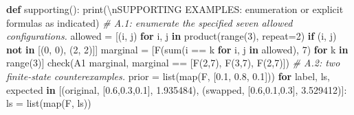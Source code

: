 \documentclass[
]{article}
\newenvironment{Shaded}{}{}
\newcommand{\BuiltInTok}[1]{\textcolor[rgb]{0.00,0.50,0.00}{#1}}
\newcommand{\CharTok}[1]{\textcolor[rgb]{0.25,0.44,0.63}{#1}}
\newcommand{\CommentTok}[1]{\textcolor[rgb]{0.38,0.63,0.69}{\textit{#1}}}
\newcommand{\ControlFlowTok}[1]{\textcolor[rgb]{0.00,0.44,0.13}{\textbf{#1}}}
\newcommand{\DecValTok}[1]{\textcolor[rgb]{0.25,0.63,0.44}{#1}}
\newcommand{\FloatTok}[1]{\textcolor[rgb]{0.25,0.63,0.44}{#1}}
\newcommand{\KeywordTok}[1]{\textcolor[rgb]{0.00,0.44,0.13}{\textbf{#1}}}
\newcommand{\NormalTok}[1]{#1}
\newcommand{\OperatorTok}[1]{\textcolor[rgb]{0.40,0.40,0.40}{#1}}
\newcommand{\StringTok}[1]{\textcolor[rgb]{0.25,0.44,0.63}{#1}}
\begin{document}
\begin{Shaded}
\begin{Highlighting}[]
\KeywordTok{def}\NormalTok{ supporting():}
    \BuiltInTok{print}\NormalTok{(}\StringTok{\textquotesingle{}}\CharTok{\textbackslash{}n}\StringTok{SUPPORTING EXAMPLES: enumeration or explicit formulas as indicated\textquotesingle{}}\NormalTok{)}
    \CommentTok{\# A.1: enumerate the specified seven allowed configurations.}
\NormalTok{    allowed }\OperatorTok{=}\NormalTok{ [(i, j) }\ControlFlowTok{for}\NormalTok{ i, j }\KeywordTok{in}\NormalTok{ product(}\BuiltInTok{range}\NormalTok{(}\DecValTok{3}\NormalTok{), repeat}\OperatorTok{=}\DecValTok{2}\NormalTok{)}
               \ControlFlowTok{if}\NormalTok{ (i, j) }\KeywordTok{not} \KeywordTok{in}\NormalTok{ [(}\DecValTok{0}\NormalTok{, }\DecValTok{0}\NormalTok{), (}\DecValTok{2}\NormalTok{, }\DecValTok{2}\NormalTok{)]]}
\NormalTok{    marginal }\OperatorTok{=}\NormalTok{ [F(}\BuiltInTok{sum}\NormalTok{(i }\OperatorTok{==}\NormalTok{ k }\ControlFlowTok{for}\NormalTok{ i, j }\KeywordTok{in}\NormalTok{ allowed), }\DecValTok{7}\NormalTok{) }\ControlFlowTok{for}\NormalTok{ k }\KeywordTok{in} \BuiltInTok{range}\NormalTok{(}\DecValTok{3}\NormalTok{)]}
\NormalTok{    check(}\StringTok{\textquotesingle{}A1 marginal\textquotesingle{}}\NormalTok{, marginal }\OperatorTok{==}\NormalTok{ [F(}\DecValTok{2}\NormalTok{,}\DecValTok{7}\NormalTok{), F(}\DecValTok{3}\NormalTok{,}\DecValTok{7}\NormalTok{), F(}\DecValTok{2}\NormalTok{,}\DecValTok{7}\NormalTok{)])}
    \CommentTok{\# A.2: two finite{-}state counterexamples.}
\NormalTok{    prior }\OperatorTok{=} \BuiltInTok{list}\NormalTok{(}\BuiltInTok{map}\NormalTok{(F, [}\StringTok{\textquotesingle{}0.1\textquotesingle{}}\NormalTok{, }\StringTok{\textquotesingle{}0.8\textquotesingle{}}\NormalTok{, }\StringTok{\textquotesingle{}0.1\textquotesingle{}}\NormalTok{]))}
    \ControlFlowTok{for}\NormalTok{ label, ls, expected }\KeywordTok{in}\NormalTok{ [(}\StringTok{\textquotesingle{}original\textquotesingle{}}\NormalTok{, [}\StringTok{\textquotesingle{}0.6\textquotesingle{}}\NormalTok{,}\StringTok{\textquotesingle{}0.3\textquotesingle{}}\NormalTok{,}\StringTok{\textquotesingle{}0.1\textquotesingle{}}\NormalTok{], }\FloatTok{1.935484}\NormalTok{),}
\NormalTok{                                (}\StringTok{\textquotesingle{}swapped\textquotesingle{}}\NormalTok{, [}\StringTok{\textquotesingle{}0.6\textquotesingle{}}\NormalTok{,}\StringTok{\textquotesingle{}0.1\textquotesingle{}}\NormalTok{,}\StringTok{\textquotesingle{}0.3\textquotesingle{}}\NormalTok{], }\FloatTok{3.529412}\NormalTok{)]:}
\NormalTok{        ls }\OperatorTok{=} \BuiltInTok{list}\NormalTok{(}\BuiltInTok{map}\NormalTok{(F, ls))}

\end{Highlighting}
\end{Shaded}
\end{document}
